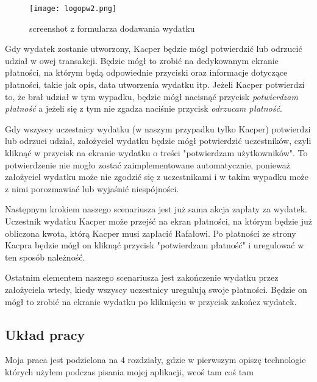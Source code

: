 \begin{figure}[!h]
	\label{fig:nowe-logo-pw}
	\centering \texttt{[image: logopw2.png]}
	\caption{screenshot z formularza dodawania wydatku}
\end{figure}

Gdy wydatek zostanie utworzony, Kacper będzie mógł potwierdzić lub odrzucić udział w owej transakcji. Będzie mógł to zrobić na dedykowanym ekranie płatności, na którym będą odpowiednie przyciski oraz informacje dotyczące płatności, takie jak opis, data utworzenia wydatku itp. Jeżeli Kacper potwierdzi to, że brał udział w tym wypadku, będzie mógł nacisnąć przycisk \emph{potwierdzam płatność} a jeżeli się z tym nie zgadza naciśnie przycisk \emph{odrzucam płatność}. 

Gdy wszyscy uczestnicy wydatku (w naszym przypadku tylko Kacper) potwierdzi lub odrzuci udział, założyciel wydatku będzie mógł potwierdzić uczestników, czyli kliknąć w przycisk na ekranie wydatku o treści "potwierdzam użytkowników". To potwierdzenie nie mogło zostać zaimplementowane automatycznie, ponieważ założyciel wydatku może nie zgodzić się z uczestnikami i w takim wypadku może z nimi porozmawiać lub wyjaśnić niespójności.

Następnym krokiem naszego scenariusza jest już sama akcja zapłaty za wydatek. Uczestnik wydatku Kacper może przejść na ekran płatności, na którym będzie już obliczona kwota, którą Kacper musi zapłacić Rafałowi. Po płatności ze strony Kacpra będzie mógł on kliknąć przycisk "potwierdzam płatność" i uregulować w ten sposób należność.

Ostatnim elementem naszego scenariusza jest zakończenie wydatku przez założyciela wtedy, kiedy wszyscy uczestnicy uregulują swoje płatności. Będzie on mógł to zrobić na ekranie wydatku po kliknięciu w przycisk zakończ wydatek.

\subsection{Układ pracy}
Moja praca jest podzielona na 4 rozdziały, gdzie w pierwszym opiszę technologie których użyłem podczas pisania mojej aplikacji, wcoś tam coś tam


